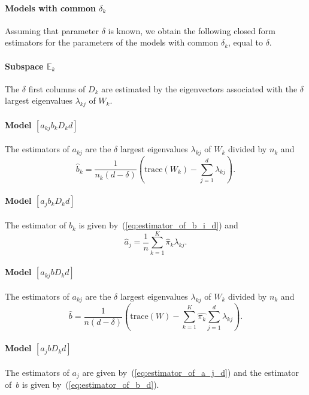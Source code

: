 \documentclass[12pt]{article}
\newcommand{\tr}{\mbox{trace}}
\begin{document}
\paragraph{Models with common $\delta_k$}
Assuming that parameter $\delta$ is known, we obtain the following closed form estimators for
the parameters of the models with common $\delta_k$, equal to $\delta$.

\paragraph{Subspace $\mathbb{E}_{k}$}
The $\delta$ first columns of $D_{k}$ are estimated by the eigenvectors associated with the
$\delta$ largest eigenvalues $\lambda_{kj}$ of $W_{k}$.

\paragraph{Model $[a_{kj}b_{k}D_{k}d]$}
The estimators of $a_{kj}$ are the $\delta$ largest eigenvalues $\lambda_{kj}$ of $W_{k}$
divided by $n_k$ and
\begin{equation}
  \hat{b}_{k}=\frac{1}{n_k(d-\delta)}\left(\tr(W_{k})-\sum_{j=1}^{d}\lambda_{kj}\right).
  \label{eq:estimator_of_b_i_d}
\end{equation}

\paragraph{Model $[a_{j}b_{k}D_{k}d]$}
The estimator of $b_{k}$ is given by~(\ref{eq:estimator_of_b_i_d}) and
\begin{equation}
  \hat{a}_{j}=\frac{1}{n}\sum_{k=1}^{K}\hat{\pi}_{k}\lambda_{kj}.
  \label{eq:estimator_of_a_j_d}
\end{equation}

\paragraph{Model $[a_{kj}bD_{k}d]$}
The estimators of $a_{kj}$ are the $\delta$ largest eigenvalues $\lambda_{kj}$ of $W_{k}$
divided by $n_k$ and
\begin{equation}
  \hat{b}=\frac{1}{n(d-\delta)}\left(\tr(W)-\sum_{k=1}^{K}\hat{\pi_k}\sum_{j=1}^{d}\lambda_{kj}\right).
  \label{eq:estimator_of_b_d}
\end{equation}

\paragraph{Model $[a_{j}bD_{k}d]$}
The estimators of $a_j$ are given by~(\ref{eq:estimator_of_a_j_d}) and the estimator of~$b$ is
given by~(\ref{eq:estimator_of_b_d}).
\end{document}
